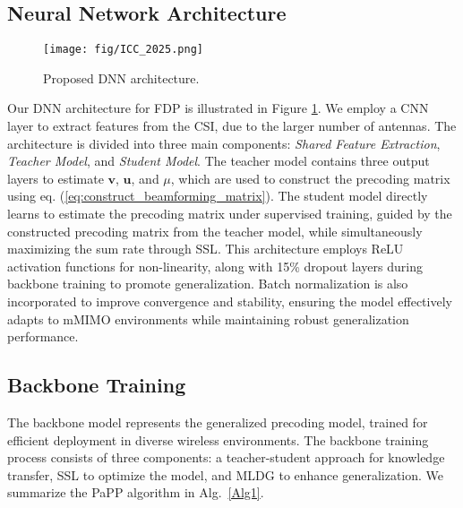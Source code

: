 \subsection{Neural Network Architecture}
\begin{figure}[t]
    \centering
    \texttt{[image: fig/ICC\_2025.png]}
    \caption{Proposed \gls{DNN} architecture.}
    \label{fig:arch}
\end{figure}
Our \gls{DNN} architecture for \gls{FDP} is illustrated in Figure \ref{fig:arch}. We employ a \gls{CNN} layer to extract features from the CSI, due to the larger number of antennas. The architecture is divided into three main components: \textit{Shared Feature Extraction}, \textit{Teacher Model}, and \textit{Student Model}. The teacher model contains three output layers to estimate $\mathbf{v}$, $\mathbf{u}$, and $\mu$, which are used to construct the precoding matrix using eq. (\ref{eq:construct_beamforming_matrix}).
The student model directly learns to estimate the precoding matrix under supervised training, guided by the constructed precoding matrix from the teacher model, while simultaneously maximizing the sum rate through \gls{SSL}. This architecture employs ReLU activation functions for non-linearity, along with 15\% dropout layers during backbone training to promote generalization. Batch normalization is also incorporated to improve convergence and stability, ensuring the model effectively adapts to \gls{mMIMO} environments while maintaining robust generalization performance.




\subsection{Backbone Training}
The backbone model represents the generalized precoding model, trained for efficient deployment in diverse wireless environments. The backbone training process consists of three components: a teacher-student approach for knowledge transfer, \gls{SSL} to optimize the model, and \gls{MLDG} to enhance generalization.
We summarize the PaPP algorithm in Alg.~\ref{Alg1}. 

